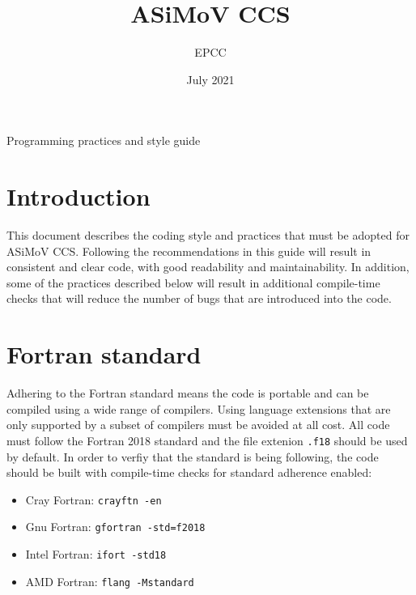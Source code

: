 \documentclass[11pt]{article}
\begin{document}
\lstset{style=codefragment}


\title{ASiMoV CCS}

\date{July 2021}
\author{EPCC}

\makeEPCCtitle

\centerline{\sc Programming practices and style guide}

\tableofcontents
\pagebreak

\bigskip


\bigskip


\section{Introduction}
This document describes the coding style and practices that must be adopted for ASiMoV CCS. Following the recommendations
in this guide will result in consistent and clear code, with good readability and maintainability. In addition, 
some of the practices described below will result in additional compile-time checks that will reduce the number of 
bugs that are introduced into the code.

\section{Fortran standard}
Adhering to the Fortran standard means the code is portable and can be compiled using a wide range of compilers. 
Using language extensions that are only supported by a subset of compilers must be avoided at all cost. All code 
must follow the Fortran 2018 standard and the file extenion \texttt{.f18} should be used by default. In order to 
verfiy that the standard is being following, the code should be built with compile-time checks for standard 
adherence enabled:
\begin{itemize}
\item Cray Fortran: \texttt{crayftn -en}
\item Gnu Fortran: \texttt{gfortran -std=f2018}
\item Intel Fortran: \texttt{ifort -std18}
\item AMD Fortran: \texttt{flang -Mstandard}
\end{itemize}  
\end{document}
